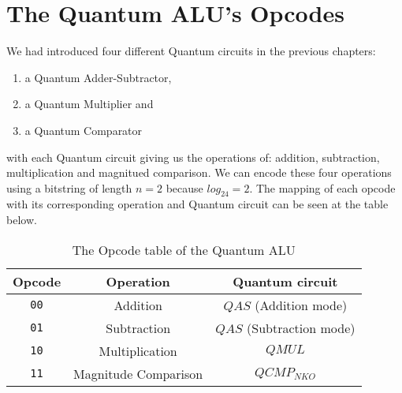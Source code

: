 \section{The Quantum ALU's Opcodes}

We had introduced four different Quantum circuits in the previous chapters:
\begin{enumerate}
    \item a Quantum Adder-Subtractor,
    \item a Quantum Multiplier and
    \item a Quantum Comparator
\end{enumerate}
with each Quantum circuit giving us the operations of: addition, subtraction, multiplication and magnitued comparison.
We can encode these four operations using a bitstring of length $n=2$ because $log_24=2$. The mapping of each opcode with
its corresponding operation and Quantum circuit can be seen at the table below.

\begin{table}[!ht]
    \centering
    \begin{tabular}{c|c|c}
        Opcode & Operation & Quantum circuit \\
        \hline
        \verb|00| & Addition & $QAS$ (Addition mode) \\
        \verb|01| & Subtraction & $QAS$ (Subtraction mode) \\
        \verb|10| & Multiplication & $QMUL$ \\
        \verb|11| & Magnitude Comparison & $QCMP_{NKO}$ \\
    \end{tabular}
    \caption{The Opcode table of the Quantum ALU}
\end{table}